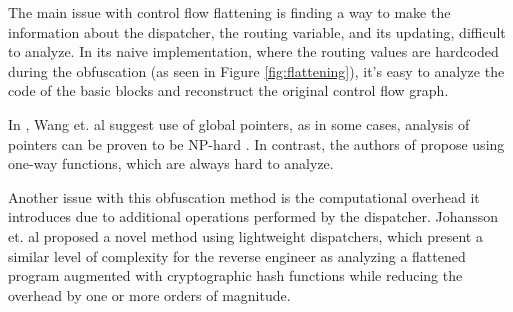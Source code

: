 \documentclass[
  digital, %
  table,   %
  twoside, %
  nolof,     %
  nolot,     %
]{fithesis3}
\theoremstyle{definition}
\begin{document}
The main issue with control flow flattening is finding a way to make the information about the dispatcher, the routing variable, and its updating, difficult to analyze. In its naive implementation, where the routing values are hardcoded during the obfuscation (as seen in Figure \ref{fig:flattening}), it's easy to analyze the code of the basic blocks and reconstruct the original control flow graph. 

In \cite{wang2001protection}, Wang et. al suggest use of global pointers, as in some cases, analysis of pointers can be proven to be NP-hard \cite{np_pointers}. In contrast, the authors of \cite{cappaert2010general} propose using one-way functions, which are always hard to analyze. 

Another issue with this obfuscation method is the computational overhead it introduces due to additional operations performed by the dispatcher. Johansson et. al \cite{johansson2017lightweight} proposed a novel method using lightweight dispatchers, which present a similar level of complexity for the reverse engineer as analyzing a flattened program augmented with cryptographic hash functions while reducing the overhead by one or more orders of magnitude.
\end{document}
